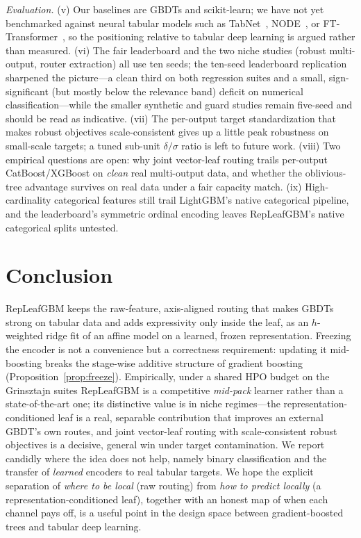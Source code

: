 \documentclass[11pt]{article}
\begin{document}
\emph{Evaluation.}
(v) Our baselines are GBDTs and scikit-learn; we have not yet benchmarked against neural
tabular models such as TabNet~\citep{arik2021tabnet}, NODE~\citep{popov2020node}, or
FT-Transformer~\citep{gorishniy2021revisiting}, so the positioning relative to tabular deep
learning is argued rather than measured. (vi) The fair leaderboard and the two niche
studies (robust multi-output, router extraction) all use ten seeds; the ten-seed
leaderboard replication sharpened the picture---a clean third on both regression suites
and a small, sign-significant (but mostly below the relevance band) deficit on numerical
classification---while the smaller synthetic and guard studies remain five-seed and
should be read as indicative. (vii) The per-output
target standardization that makes robust objectives scale-consistent gives up a little peak
robustness on small-scale targets; a tuned sub-unit $\delta/\sigma$ ratio is left to future
work. (viii) Two empirical questions are open: why joint vector-leaf routing trails
per-output CatBoost/XGBoost on \emph{clean} real multi-output data, and whether the
oblivious-tree advantage survives on real data under a fair capacity match. (ix)
High-cardinality categorical features still trail LightGBM's native categorical pipeline, and
the leaderboard's symmetric ordinal encoding leaves RepLeafGBM's native categorical splits
untested.

\section{Conclusion}
\label{sec:conclusion}

RepLeafGBM keeps the raw-feature, axis-aligned routing that makes GBDTs strong on tabular
data and adds expressivity only inside the leaf, as an $h$-weighted ridge fit of an affine
model on a learned, frozen representation. Freezing the encoder is not a convenience but a
correctness requirement: updating it mid-boosting breaks the stage-wise additive structure
of gradient boosting (Proposition~\ref{prop:freeze}). Empirically, under a
shared HPO budget on the Grinsztajn suites RepLeafGBM is a competitive \emph{mid-pack}
learner rather than a state-of-the-art one; its distinctive value is in niche regimes---the
representation-conditioned leaf is a real, separable contribution that improves an external
GBDT's own routes, and joint vector-leaf routing with scale-consistent robust objectives is a
decisive, general win under target contamination. We report candidly where the idea does not
help, namely binary classification and the transfer of \emph{learned} encoders to real
tabular targets. We hope
the explicit separation of \emph{where to be local} (raw routing) from \emph{how to predict
locally} (a representation-conditioned leaf), together with an honest map of when each
channel pays off, is a useful point in the design space between gradient-boosted trees and
tabular deep learning.
\end{document}
